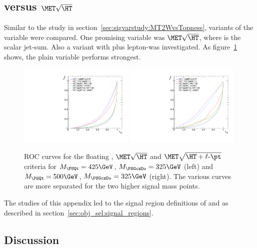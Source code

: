 \subsection{\texorpdfstring{\MET}{MET} versus \texorpdfstring{$\MET\sqrt{\HT}$}{MET/sqrt(HT)}}

Similar to the study in section~\ref{sec:sigvarstudy:MT2WvsTopness}, variants of the \MET variable were compared. One promising variable was $\MET\sqrt{\HT}$, where \HT is the scalar jet-\pt sum. Also a variant with \HT plus lepton-\pt was investigated. As figure~\ref{fig:sigvarstudy:METvsMETsqrtHT:ROC} shows, the plain \MET variable performs strongest.
\begin{figure}
\includegraphics[width=0.49\textwidth]{Figures/SignalVariableStudies/ROC_METCompare_Stop_425_325.pdf}
\includegraphics[width=0.49\textwidth]{Figures/SignalVariableStudies/ROC_METCompare_Stop_500_325.pdf}
\caption{\label{fig:sigvarstudy:METvsMETsqrtHT:ROC} ROC curves for the floating \MET, $\MET\sqrt{\HT}$ and $\MET\sqrt{\HT+\ell\text{-}\pt}$ criteria for $M_{\PSQt} = 425\GeV$, $M_{\PSGczDo} = 325\GeV$ (left) and $M_{\PSQt} = 500\GeV$, $M_{\PSGczDo} = 325\GeV$ (right). The various curves are more separated for the two higher signal mass points.}
\end{figure}

The studies of this appendix led to the signal region definitions of \MET and \MTtW as described in section~\ref{sec:obj_sel:signal_regions}.

\subsection{Discussion}

